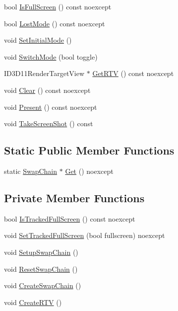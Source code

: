 \begin{DoxyCompactItemize}
\item 
bool \hyperlink{classmage_1_1_swap_chain_a85873ca586fbcd83c237692a011d6d08}{Is\+Full\+Screen} () const noexcept
\item 
bool \hyperlink{classmage_1_1_swap_chain_aba3697d2b641b99f7e89fcc59613f89d}{Lost\+Mode} () const noexcept
\item 
void \hyperlink{classmage_1_1_swap_chain_a662009705a6e23064351fd0d9b77ef0e}{Set\+Initial\+Mode} ()
\item 
void \hyperlink{classmage_1_1_swap_chain_ada1b8857eeac3d00287fb624645e365e}{Switch\+Mode} (bool toggle)
\item 
I\+D3\+D11\+Render\+Target\+View $\ast$ \hyperlink{classmage_1_1_swap_chain_a0b54dff5a39f10d9073bdbb1121a6144}{Get\+R\+TV} () const noexcept
\item 
void \hyperlink{classmage_1_1_swap_chain_a94b28938ba9e402665197a71409ae43a}{Clear} () const noexcept
\item 
void \hyperlink{classmage_1_1_swap_chain_a477d34baf72331aeff23f32cd34518b6}{Present} () const noexcept
\item 
void \hyperlink{classmage_1_1_swap_chain_a23a4618b5104203c5a5c962696ae3b53}{Take\+Screen\+Shot} () const
\end{DoxyCompactItemize}
\subsection*{Static Public Member Functions}
\begin{DoxyCompactItemize}
\item 
static \hyperlink{classmage_1_1_swap_chain}{Swap\+Chain} $\ast$ \hyperlink{classmage_1_1_swap_chain_a9ed25cd34dedc97e25e26e58456ac2fe}{Get} () noexcept
\end{DoxyCompactItemize}
\subsection*{Private Member Functions}
\begin{DoxyCompactItemize}
\item 
bool \hyperlink{classmage_1_1_swap_chain_ad3b35e10612f7219cc4b6d61039e2f8c}{Is\+Tracked\+Full\+Screen} () const noexcept
\item 
void \hyperlink{classmage_1_1_swap_chain_ae2689c07632f1fdc8367c9eefd62851b}{Set\+Tracked\+Full\+Screen} (bool fullscreen) noexcept
\item 
void \hyperlink{classmage_1_1_swap_chain_aec2b14bc569046174f6a416a7f20c8d5}{Setup\+Swap\+Chain} ()
\item 
void \hyperlink{classmage_1_1_swap_chain_a30b25245e86823e1b08a39887de8d918}{Reset\+Swap\+Chain} ()
\item 
void \hyperlink{classmage_1_1_swap_chain_a9474cae31868f020c76439febc6e1afd}{Create\+Swap\+Chain} ()
\item 
void \hyperlink{classmage_1_1_swap_chain_a9cdb798d8911e2f1239ad7eb79cc6b87}{Create\+R\+TV} ()
\end{DoxyCompactItemize}
